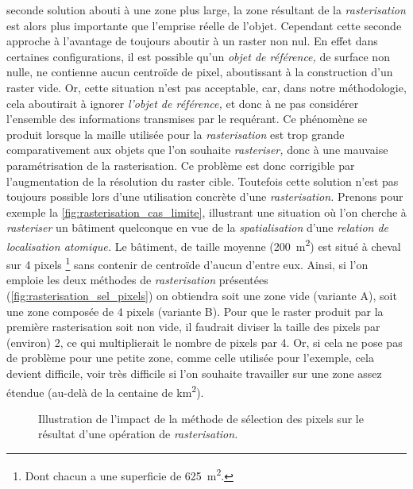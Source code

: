 seconde solution abouti à une zone plus large, la zone résultant de la
\emph{rasterisation} est alors plus importante que l'emprise réelle de
l'objet. Cependant cette seconde approche à l'avantage de toujours
aboutir à un raster non nul. En effet dans certaines configurations,
il est possible qu'un \emph{objet de référence,} de surface non nulle,
ne contienne aucun centroïde de pixel, aboutissant à la construction
d'un raster vide. Or, cette situation n'est pas acceptable, car, dans
notre méthodologie, cela aboutirait à ignorer \emph{l'objet de
  référence,} et donc à ne pas considérer l'ensemble des informations
transmises par le requérant. Ce phénomène se produit lorsque la maille
utilisée pour la \emph{rasterisation} est trop grande comparativement
aux objets que l'on souhaite \emph{rasteriser,} donc à une mauvaise
paramétrisation de la rasterisation. Ce problème est donc corrigible
par l'augmentation de la résolution du raster cible. Toutefois cette
solution n'est pas toujours possible lors d'une utilisation concrète
d'une \emph{rasterisation.} Prenons pour exemple la
\autoref{fig:rasterisation_cas_limite}, illustrant une situation où
l'on cherche à \emph{rasteriser} un bâtiment quelconque en vue de la
\emph{spatialisation} d'une \emph{relation de localisation atomique.}
Le bâtiment, de taille moyenne (\ie \SI{200}{\metre\squared}) est
situé à cheval sur 4 pixels \footnote{Dont chacun a une superficie de
  \SI{625}{\metre\squared}.} sans contenir de centroïde d'aucun
d'entre eux. Ainsi, si l'on emploie les deux méthodes de
\emph{rasterisation} présentées
(\autoref{fig:rasterisation_sel_pixels}) on obtiendra soit une zone
vide (variante \textcolor{RdBu-9-1}{\textsf{A}}), soit une zone
composée de 4 pixels (variante \textcolor{RdBu-9-9}{\textsf{B}}). Pour
que le raster produit par la première rasterisation soit non vide, il
faudrait diviser la taille des pixels par (environ) 2, ce qui
multiplierait le nombre de pixels par 4. Or, si cela ne pose pas de
problème pour une petite zone, comme celle utilisée pour l'exemple,
cela devient difficile, voir très difficile si l'on souhaite
travailler sur une zone assez étendue (au-delà de la centaine de
\si{\kilo\meter\squared}).

\begin{figure}
  \centering
  
  \caption{Illustration de l'impact de la méthode de sélection des
    pixels sur le résultat d'une opération de \emph{rasterisation.}}
  \label{fig:rasterisation_sel_pixels}
\end{figure}

